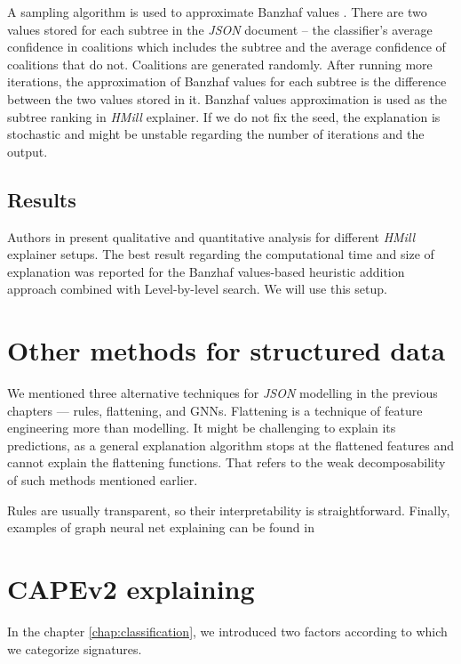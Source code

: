 A sampling algorithm is used to approximate Banzhaf values \cite{Bachrach2010}. There are two values stored for each subtree in the \emph{JSON} document -- the classifier's average confidence in coalitions which includes the subtree and the average confidence of coalitions that do not. Coalitions are generated randomly. After running more iterations, the approximation of Banzhaf values for each subtree is the difference between the two values stored in it. Banzhaf values approximation is used as the subtree ranking in \emph{HMill} explainer. If we do not fix the seed, the explanation is stochastic and might be unstable regarding the number of iterations and the output.

\subsection{Results}
Authors in \cite{Pevny2020} present qualitative and quantitative analysis for different \emph{HMill} explainer setups. The best result regarding the computational time and size of explanation was reported for the Banzhaf values-based heuristic addition approach combined with Level-by-level search. We will use this setup.

\section{Other methods for structured data}
We mentioned three alternative techniques for \emph{JSON} modelling in the previous chapters --- rules, flattening, and GNNs. Flattening is a technique of feature engineering more than modelling. It might be challenging to explain its predictions, as a general explanation algorithm stops at the flattened features and cannot explain the flattening functions. That refers to the weak decomposability of such methods mentioned earlier.

Rules are usually transparent, so their interpretability is straightforward. Finally, examples of graph neural net explaining can be found in \cite{Ying2019, Huang2020} 


\section{CAPEv2 explaining}
In the chapter \ref{chap:classification}, we introduced two factors according to which we categorize signatures.

